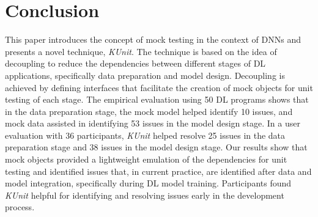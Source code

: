 \section[Conclusion]{Conclusion}
This paper introduces the concept of mock testing in the context of DNNs and presents a novel technique, {\em KUnit}. 
The technique is based on the idea of decoupling to reduce the dependencies between different stages of DL applications, specifically data preparation and model design. 
Decoupling is achieved by defining interfaces 
that facilitate the creation of mock objects for unit testing of each stage.
The empirical evaluation using 50 DL programs shows that in the data preparation stage, the mock model helped identify 10 issues, and mock data
assisted in identifying 53 issues in the model design stage.
In a user evaluation with 36 participants, {\em KUnit} helped resolve 25 issues in the data preparation stage and 38 issues in the model design stage.
Our results show that mock objects provided a lightweight emulation of the dependencies for unit testing and
identified issues that, in current practice, are identified after data and model integration, specifically during DL model training.
Participants found {\em KUnit} helpful for identifying and resolving issues early in the development process.

\label{sec:conclusion}

